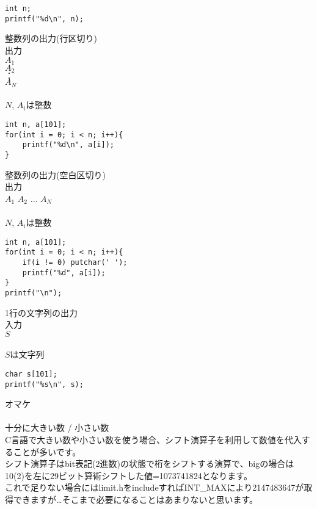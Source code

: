 \noindent
\begin{lstlisting}[style = customC]
int n;
printf("%d\n", n);
\end{lstlisting}

\noindent
{\Large 整数列の出力(行区切り)}\\ 
出力\\
$A_1$\\
$A_2$\\
$：$\\
$A_N$
\\ \\ \noindent
$N$, $A_i$は整数

\noindent
\begin{lstlisting}[style = customC]
int n, a[101];
for(int i = 0; i < n; i++){
    printf("%d\n", a[i]);
}
\end{lstlisting}

\noindent
{\Large 整数列の出力(空白区切り)}\\ 
出力\\
$A_1$ $A_2$ $...$ $A_N$
\\ \\ \noindent
$N$, $A_i$は整数

\noindent
\begin{lstlisting}[style = customC]
int n, a[101];
for(int i = 0; i < n; i++){
    if(i != 0) putchar(' ');
    printf("%d", a[i]);
}
printf("\n");
\end{lstlisting}

\noindent
{\Large 1行の文字列の出力}\\ 
入力\\
$S$
\\ \\ \noindent
$S$は文字列

\noindent
\begin{lstlisting}[style = customC]
char s[101];
printf("%s\n", s);
\end{lstlisting}

\noindent
{\LARGE オマケ}\\ \hrulefill \\
{\Large 十分に大きい数 / 小さい数}\\ 
C言語で大きい数や小さい数を使う場合、シフト演算子を利用して数値を代入することが多いです。\\
シフト演算子はbit表記(2進数)の状態で桁をシフトする演算で、bigの場合は10(2)を左に29ビット算術シフトした値=1073741824となります。\\
これで足りない場合にはlimit.hをincludeすればINT\_MAXにより2147483647が取得できますが…そこまで必要になることはあまりないと思います。\\

